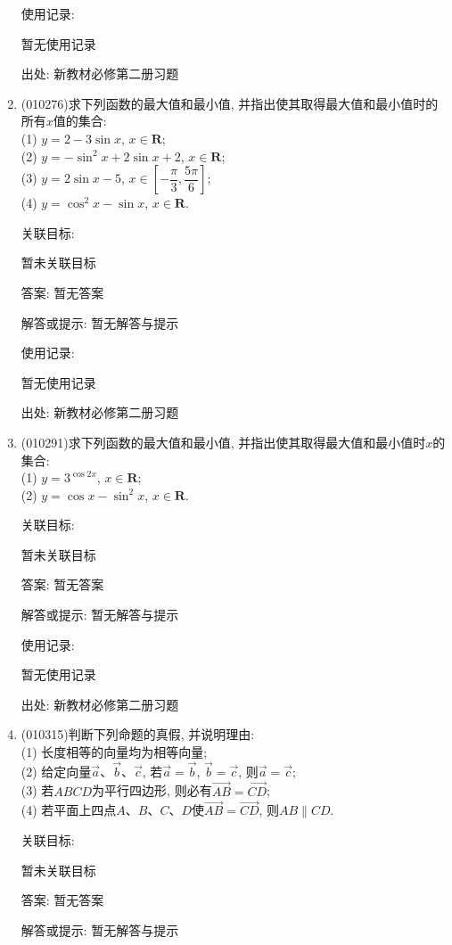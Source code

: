 \documentclass[10pt,a4paper]{article}
\begin{document}
\begin{enumerate}[1.]
使用记录:

暂无使用记录


出处: 新教材必修第二册习题
\item { (010276)}求下列函数的最大值和最小值, 并指出使其取得最大值和最小值时的所有$x$值的集合:\\
(1) $y=2-3\sin x$, $x\in \mathbf{R}$;\\
(2) $y=-\sin^2x+2\sin x+2$, $x\in \mathbf{R}$;\\
(3) $y=2\sin x-5$, $x\in [-\dfrac \pi 3, \dfrac{5\pi} 6]$;\\
(4) $y=\cos^2x-\sin x$, $x\in \mathbf{R}$.


关联目标:

暂未关联目标

答案: 暂无答案

解答或提示: 暂无解答与提示

使用记录:

暂无使用记录


出处: 新教材必修第二册习题
\item { (010291)}求下列函数的最大值和最小值, 并指出使其取得最大值和最小值时$x$的集合:\\
(1) $y=3^{\cos 2x}$, $x\in \mathbf{R}$;\\
(2) $y=\cos x-\sin^2x$, $x\in \mathbf{R}$.


关联目标:

暂未关联目标

答案: 暂无答案

解答或提示: 暂无解答与提示

使用记录:

暂无使用记录


出处: 新教材必修第二册习题
\item { (010315)}判断下列命题的真假, 并说明理由:\\
(1) 长度相等的向量均为相等向量;\\
(2) 给定向量$\overrightarrow a$、$\overrightarrow b$、$\overrightarrow c$, 若$\overrightarrow a=\overrightarrow b$, $\overrightarrow b=\overrightarrow c$, 则$\overrightarrow a=\overrightarrow c$;\\
(3) 若$ABCD$为平行四边形, 则必有$\overrightarrow{AB}=\overrightarrow{CD}$;\\
(4) 若平面上四点$A$、$B$、$C$、$D$使$\overrightarrow{AB}=\overrightarrow{CD}$, 则$AB\parallel CD$.


关联目标:

暂未关联目标

答案: 暂无答案

解答或提示: 暂无解答与提示


\end{enumerate}
\end{document}
